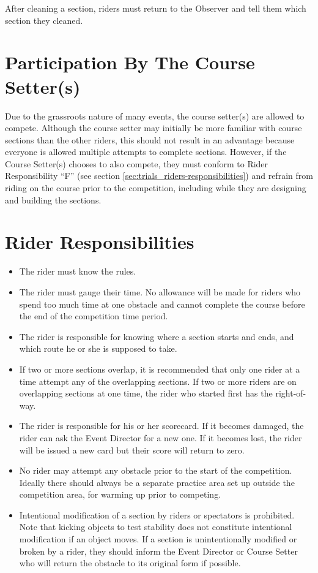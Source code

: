 After cleaning a section, riders must return to the Observer and tell them which section they cleaned.

\section{Participation By The Course Setter(s)}
Due to the grassroots nature of many events, the course setter(s) are allowed to compete. 
Although the course setter may initially be more familiar with course sections than the other riders, this should not result in an advantage because everyone is allowed multiple attempts to complete sections. 
However, if the Course Setter(s) chooses to also compete, they must conform to Rider Responsibility ``F'' (see section \ref{sec:trials_riders-responsibilities}) and refrain from riding on the course prior to the competition, including while they are designing and building the sections.

\section{Rider Responsibilities \label{sec:trials_riders-responsibilities}}
\begin{itemize}
\item The rider must know the rules.
\item The rider must gauge their time. 
No allowance will be made for riders who spend too much time at one obstacle and cannot complete the course before the end of the competition time period.
\item The rider is responsible for knowing where a section starts and ends, and which route he or she is supposed to take.
\item If two or more sections overlap, it is recommended that only one rider at a time attempt any of the overlapping sections. 
If two or more riders are on overlapping sections at one time, the rider who started first has the right-of-way.
\item The rider is responsible for his or her scorecard. 
If it becomes damaged, the rider can ask the Event Director for a new one. 
If it becomes lost, the rider will be issued a new card but their score will return to zero.
\item No rider may attempt any obstacle prior to the start of the competition. 
Ideally there should always be a separate practice area set up outside the competition area, for warming up prior to competing.
\item Intentional modification of a section by riders or spectators is prohibited. 
Note that kicking objects to test stability does not constitute intentional modification if an object moves. 
If a section is unintentionally modified or broken by a rider, they should inform the Event Director or Course Setter who will return the obstacle to its original form if possible.
\end{itemize}


